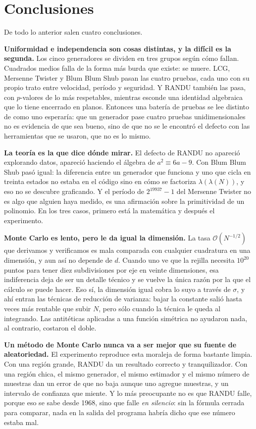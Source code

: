\documentclass[11pt,letterpaper]{article}
\begin{document}
\section{Conclusiones}

De todo lo anterior salen cuatro conclusiones.

\textbf{Uniformidad e independencia son cosas distintas, y la difícil es la
segunda.} Los cinco generadores se dividen en tres grupos según cómo fallan.
Cuadrados medios falla de la forma más burda que existe: se muere. LCG,
Mersenne Twister y Blum Blum Shub pasan las cuatro pruebas, cada uno con su
propio trato entre velocidad, período y seguridad. Y RANDU también las pasa,
con $p$-valores de lo más respetables, mientras esconde una identidad
algebraica que lo tiene encerrado en \PlanosRandu{} planos. Entonces una
batería de pruebas se lee distinto de como uno esperaría: que un generador
pase cuatro pruebas unidimensionales no es evidencia de que sea bueno, sino
de que no se le encontró el defecto con las herramientas que se usaron, que
no es lo mismo.

\textbf{La teoría es la que dice dónde mirar.} El defecto de RANDU no
apareció explorando datos, apareció haciendo el álgebra de
$a^2 \equiv 6a - 9$. Con Blum Blum Shub pasó igual: la diferencia entre un
generador que funciona y uno que cicla en treinta estados no estaba en el
código sino en cómo se factoriza $\lambda(\lambda(N))$, y eso no se descubre
graficando. Y el período de $2^{19937}-1$ del Mersenne Twister no es algo que
alguien haya medido, es una afirmación sobre la primitividad de un polinomio.
En los tres casos, primero está la matemática y después el experimento.

\textbf{Monte Carlo es lento, pero le da igual la dimensión.} La tasa
$\mathcal{O}(N^{-1/2})$ que derivamos y verificamos es mala comparada con
cualquier cuadratura en una dimensión, y aun así no depende de $d$. Cuando
uno ve que la rejilla necesita $10^{20}$ puntos para tener diez subdivisiones
por eje en veinte dimensiones, esa indiferencia deja de ser un detalle
técnico y se vuelve la única razón por la que el cálculo se puede hacer. Eso
sí, la dimensión igual cobra lo suyo a través de $\sigma$, y ahí entran las
técnicas de reducción de varianza: bajar la constante salió hasta
\FactorControlSeno{} veces más rentable que subir $N$, pero sólo cuando la
técnica le queda al integrando. Las antitéticas aplicadas a una función
simétrica no ayudaron nada, al contrario, costaron el doble.

\textbf{Un método de Monte Carlo nunca va a ser mejor que su fuente de
aleatoriedad.} El experimento reproduce esta moraleja de forma bastante
limpia. Con una región grande, RANDU da un resultado correcto y
tranquilizador. Con una región chica, el mismo generador, el mismo estimador
y el mismo número de muestras dan un error de \RelativoRanduBola{} que no
baja aunque uno agregue muestras, y un intervalo de confianza que miente. Y
lo más preocupante no es que RANDU falle, porque eso se sabe desde 1968, sino
que falle \emph{en silencio}: sin la fórmula cerrada para comparar, nada en
la salida del programa habría dicho que ese número estaba mal.
\end{document}
